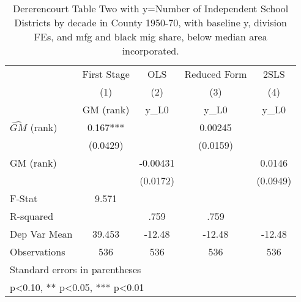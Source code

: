\begin{table}[htbp]\centering
\def\sym#1{\ifmmode^{#1}\else\(^{#1}\)\fi}
\caption{Dererencourt Table Two with y=Number of Independent School Districts by decade in County 1950-70, with baseline y, division FEs, and mfg and black mig share, below median area incorporated.}
\begin{tabular}{l*{4}{c}}
\toprule
                    & First Stage   &         OLS   &Reduced Form   &        2SLS   \\
                    &\multicolumn{1}{c}{(1)}&\multicolumn{1}{c}{(2)}&\multicolumn{1}{c}{(3)}&\multicolumn{1}{c}{(4)}\\
                    &\multicolumn{1}{c}{GM  (rank)}&\multicolumn{1}{c}{y\_L0}&\multicolumn{1}{c}{y\_L0}&\multicolumn{1}{c}{y\_L0}\\
\midrule
$\hat{GM}$ (rank)   &       0.167***&               &     0.00245   &               \\
                    &    (0.0429)   &               &    (0.0159)   &               \\
\addlinespace
GM  (rank)          &               &    -0.00431   &               &      0.0146   \\
                    &               &    (0.0172)   &               &    (0.0949)   \\
\midrule
F-Stat              &       9.571   &               &               &               \\
R-squared           &               &        .759   &        .759   &               \\
Dep Var Mean        &      39.453   &      -12.48   &      -12.48   &      -12.48   \\
Observations        &         536   &         536   &         536   &         536   \\
\bottomrule
\multicolumn{5}{l}{\footnotesize Standard errors in parentheses}\\
\multicolumn{5}{l}{\footnotesize * p<0.10, ** p<0.05, *** p<0.01}\\
\end{tabular}
\end{table}
